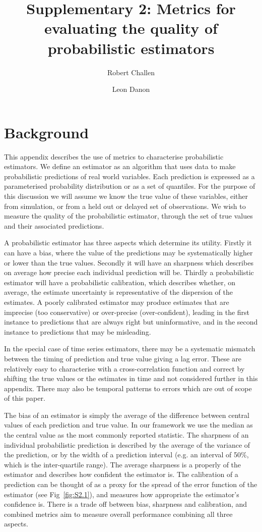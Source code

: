 \documentclass[a4paper, 12pt, twoside]{article}
\title{Supplementary 2: Metrics for evaluating the quality of probabilistic estimators}
\author[1,2]{Robert Challen}
\author[1,2]{Leon Danon}
\affil[1]{AI4CI, University of Bristol, Bristol, UK.}
\affil[2]{Department of Engineering Mathematics, University of Bristol, Bristol, UK.}
\date{}                     %
\let\Oldsection\section
\renewcommand{\section}{\FloatBarrier\Oldsection}
\begin{document}
\maketitle

\section{Background}

This appendix describes the use of metrics to characterise probabilistic estimators. We define an estimator as an algorithm that uses data to make probabilistic predictions of real world variables. Each prediction is expressed as a parameterised probability distribution or as a set of quantiles. For the purpose of this discussion we will assume we know the true value of these variables, either from simulation, or from a held out or delayed set of observations. We wish to measure the quality of the probabilistic estimator, through the set of true values and their associated predictions.

A probabilistic estimator has three aspects which determine its utility. Firstly it can have a bias, where the value of the predictions may be systematically higher or lower than the true values. Secondly it will have an sharpness which describes on average how precise each individual prediction will be. Thirdly a probabilistic estimator will have a probabilistic calibration, which describes whether, on average, the estimate uncertainty is representative of the dispersion of the estimates. A poorly calibrated estimator may produce estimates that are imprecise (too conservative) or over-precise (over-confident), leading in the first instance to predictions that are always right but uninformative, and in the second instance to predictions that may be misleading.

In the special case of time series estimators, there may be a systematic mismatch between the timing of prediction and true value giving a lag error. These are relatively easy to characterise with a cross-correlation function and correct by shifting the true values or the estimates in time and not considered further in this appendix. There may also be temporal patterns to errors which are out of scope of this paper.

The bias of an estimator is simply the average of the difference between central values of each prediction and true value. In our framework we use the median as the central value as the most commonly reported statistic. The sharpness of an individual probabilistic prediction is described by the average of the variance of the prediction, or by the width of a prediction interval (e.g. an interval of 50\%, which is the inter-quartile range). The average sharpness is a properly of the estimator and describes how confident the estimator is. The calibration of a prediction can be thought of as a proxy for the spread of the error function of the estimator (see Fig~\ref{fig:S2.1}), and measures how appropriate the estimator's confidence is. There is a trade off between bias, sharpness and calibration, and combined metrics aim to measure overall performance combining all three aspects.
\end{document}
